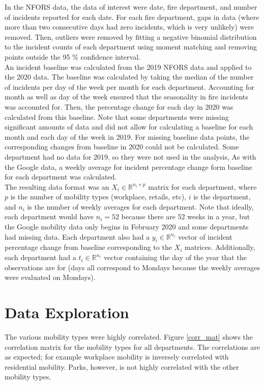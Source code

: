 \documentclass[paper=a4, fontsize=11pt]{scrartcl}
\numberwithin{equation}{section}		%
\numberwithin{figure}{section}			%
\numberwithin{table}{section}				%
\begin{document}
In the NFORS data, the data of interest were date, fire department, and number of incidents reported for each date. For each fire department, gaps in data (where more than two consecutive days had zero incidents, which is very unlikely) were removed. Then, outliers were removed by fitting a negative binomial distribution to the incident counts of each department using moment matching and removing points outside the 95 \% confidence interval.\\


An incident baseline was calculated from the 2019 NFORS data and applied to the 2020 data. The baseline was calculated by taking the median of the number of incidents per day of the week per month for each department. Accounting for month as well as day of the week ensured that the seasonality in fire incidents was accounted for. Then, the percentage change for each day in 2020 was calculated from this baseline. Note that some departments were missing significant amounts of data and did not allow for calculating a baseline for each month and each day of the week in 2019. For missing baseline data points, the corresponding changes from baseline in 2020 could not be calculated.  Some department had no data for 2019, so they were not used in the analysis, As with the Google data, a weekly average for incident percentage change form baseline for each department was calculated. \\

 The resulting data format was an $X_i \in \mathbb{R}^{n_i \times p}$ matrix for each department, where $p$ is the number of mobility types (workplace, retails, etc), $i$ is the department, and $n_i$ is the number of weekly averages for each department. Note that ideally, each department would have $n_i = 52$ because there are 52 weeks in a year, but the Google mobility data only begins in February 2020 and some departments had missing data. Each department also had a $y_i \in \mathbb{R}^{n_i}$ vector of incident percentage change from baseline corresponding to the $X_i$ matrices. Additionally, each department had a $t_i \in \mathbb{R}^{n_i}$ vector containing the day of the year that the observations are for (days all correspond to Mondays because the weekly averages were evaluated on Mondays).


\section{Data Exploration}
The various mobility types were highly correlated. Figure \ref{corr_mat} shows the correlation matrix for the mobility types for all departments. The correlations are as expected; for example workplace mobility is inversely correlated with residential mobility. Parks, however, is not highly correlated with the other mobility types.
\end{document}

